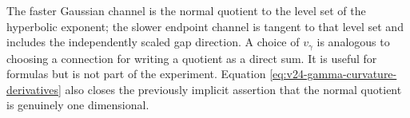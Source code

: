 \begin{remark}
\label{rem:v24-two-rate-geometry}
The faster Gaussian channel is the normal quotient to the level set of the
hyperbolic exponent; the slower endpoint channel is tangent to that level set
and includes the independently scaled gap direction.  A choice of
\(v_\gamma\) is analogous to choosing a connection for writing a quotient as
a direct sum.  It is useful for formulas but is not part of the experiment.
Equation \eqref{eq:v24-gamma-curvature-derivatives} also closes the previously
implicit assertion that the normal quotient is genuinely one dimensional.
\end{remark}
